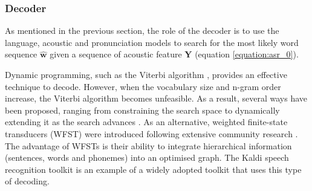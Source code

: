 \subsubsection{Decoder}%
As mentioned in the previous section, the role of the decoder is to use the language, acoustic and pronunciation models to search for the most likely word sequence $\boldsymbol{\hat{w}}$ given a sequence of acoustic feature $\boldsymbol{Y}$ (equation \ref{equation:asr_0}). %

Dynamic programming, such as the Viterbi algorithm \cite{viterbi_decoder}, provides an effective technique to decode.%
However, when the vocabulary size and n-gram order increase, the Viterbi algorithm becomes unfeasible. As a result, several ways have been proposed, ranging from constraining the search space \cite{valtchev1994novel} to dynamically extending it as the search advances \cite{aubert1995large}. As an alternative, weighted finite-state transducers (WFST) were introduced following extensive community research \cite{mohri1997finite,caseiro2002using}. The advantage of WFSTs is their ability to integrate hierarchical information (sentences, words and phonemes) into an optimised graph. The Kaldi speech recognition toolkit \cite{kaldi} is an example of a widely adopted toolkit that uses this type of decoding. 


\newpage
